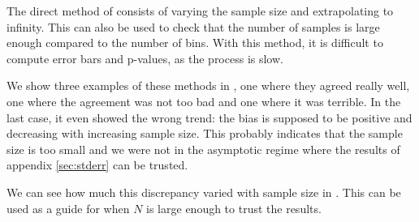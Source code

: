 \documentclass[12pt]{article}
\begin{document}
The direct method of \cite{1998PhRvL..80..197S} consists of varying the sample size and extrapolating to infinity. This can also be used to check that the number of samples is large enough compared to the number of bins. With this method, it is difficult to compute error bars and p-values, as the process is slow.

We show three examples of these methods in , one where they agreed really well, one where the agreement was not too bad and one where it was terrible. In the last case, it even showed the wrong trend: the bias is supposed to be positive and decreasing with increasing sample size. This probably indicates that the sample size is too small and we were not in the asymptotic regime where the results of appendix \ref{sec:stderr} can be trusted.

We can see how much this discrepancy varied with sample size in . This can be used as a guide for when $N$ is large enough to trust the results.
\end{document}

